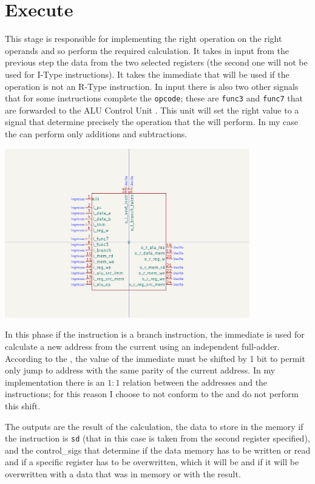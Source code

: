 \documentclass{article}
\begin{document}
\section{Execute}
\begin{minipage}{0.48\textwidth}
This stage is responsible for implementing the right operation on the right operands and so perform
the required calculation. It takes in input from the previous step the data from the two selected
registers (the second one will not be used for I-Type instructions). It takes the immediate that will be used
if the operation is not an R-Type instruction. In input there is also two other signals that for some instructions
complete the \texttt{opcode}; these are \texttt{func3} and \texttt{func7} that are forwarded to the 
ALU Control Unit . This unit will set the right value to a signal that determine precisely
the operation that the \ALU will perform. In my case the \ALU can perform only additions and subtractions.
\end{minipage}
\begin{minipage}{0.48\textwidth}
  \includegraphics[width=0.8\textwidth,right,trim={400 150 400 150},clip]{components/Execute.png}
\end{minipage}

In this phase if the instruction is a branch instruction, the immediate is used for calculate
a new address from the current \PC using an independent full-adder. According to the \ISA, the value 
of the immediate must be shifted by 1 bit to permit only jump to address with the same parity
of the current address. In my implementation there is an $1:1$ relation between the addresses and 
the instructions; for this reason I choose to not conform to the \ISA and do not perform this shift.

The outputs are the result of the \ALU calculation, the data to store in the memory if the instruction is
\texttt{sd} (that in this case is taken from the second register specified), and the \glspl{control_sig}
that determine if the data memory has to be written or read and if a specific register has to be overwritten,
which it will be and if it will be overwritten with a data that was in memory or with the \ALU result.
 
\end{document}
